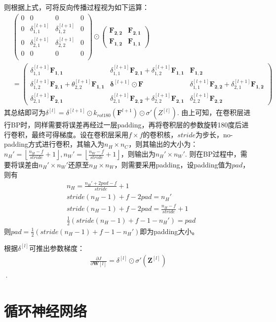 则根据上式，可将反向传播过程视为如下运算：
$$
\begin{aligned}
  &\left(
  \begin{array}{cccc}
    0 & 0 & 0 & 0 \\ 
    0 & \delta^{[l+1]}_{1,1} & \delta^{[l+1]}_{1,2} & 0 \\
    0 & \delta^{[l+1]}_{2,1} & \delta^{[l+1]}_{2,2} & 0 \\
    0 & 0 & 0 & 0 \\
  \end{array}
\right) \odot \left(
  \begin{array}{cc}
    \mathbf{F_{2,2}} & \mathbf{F_{2,1}} \\
    \mathbf{F_{1,2}} & \mathbf{F_{1,1}}
  \end{array}
\right) \\ 
&= \left(
  \begin{array}{ccc}
    \delta^{[l+1]}_{1,1} \mathbf{F_{1,1}} & \delta^{[l+1]}_{1,1} \mathbf{F_{2,1}} + \delta^{[l+1]}_{1,2} \mathbf{F_{1,1}} & \mathbf{F_{1,2}} \\ 
    \delta^{[l+1]}_{1,2} \mathbf{F_{2,1}} + \theta^{[l+1]}_{2,2} \mathbf{F_{1,1}} & \mathbf{\delta}^{[l+1]}\odot \mathbf{F} & \delta^{[l+1]}_{1,1} \mathbf{F_{2,2}} + \delta^{[l+1]}_{2,1} \mathbf{F_{1,2}} \\ 
    \delta^{[l+1]}_{2,1} \mathbf{F_{2,1}} & \delta^{[l+1]}_{2,1} \mathbf{F_{2,2}} + \delta^{[l+1]}_{2,2} \mathbf{F_{2,1}} & \delta^{[l+1]}_{2,2} \mathbf{F_{2,2}}
  \end{array}
\right)
\end{aligned}
$$
其总结即可为$\delta ^{[l]} = \delta^{[l+1]}\odot k_{rot180} \left(\mathbf{F}^{l+1}\right) \odot \sigma ' \left(Z^{[l]}\right)$. 由上可知，在卷积层进行BP时，同样需要将误差再经过一层padding，再将卷积层的参数旋转180度后进行卷积，最终可得梯度。设在卷积层采用$f \times f$的卷积核，$stride$为步长，no-padding方式进行卷积，其输入为$n_H \times n_C$，则其输出的大小为：$n_H' = \left\lfloor \frac{n_H - f}{stride} + 1 \right \rfloor, n_W' = \left\lfloor \frac{n_W - f}{stride} + 1 \right \rfloor$，则输出为$n_H' \times n_W'$. 则在BP过程中，需要将误差由$n_H' \times n_W'$还原至$n_H \times n_W$，则需要采用padding，设padding值为$pad$，则有
$$
\begin{aligned}
  &n_H = \frac{n_H' + 2pad - f}{stride} + 1 \\ 
  &stride(n_H - 1) + f - 2pad = n_H' \\ 
  & stride(n_H - 1) + f - 2pad = \frac{n_H - f}{stride} + 1 \\ 
  & \frac{1}{2} \left(stride(n_H - 1) + f - 1 - n_H'\right) = pad
\end{aligned}
$$
则$pad=\frac{1}{2} \left(stride(n_H - 1) + f - 1 - n_H'\right)$即为padding大小。

根据$\delta ^{[l]}$可推出参数梯度：
$$
\begin{aligned}
  \frac{\partial J}{\partial \mathbf{W}{[l]}} = \delta ^{[l]}\odot\sigma '\left(\mathbf{Z}^{[l]}\right) \\
\end{aligned}
$$
·
\section{循环神经网络}